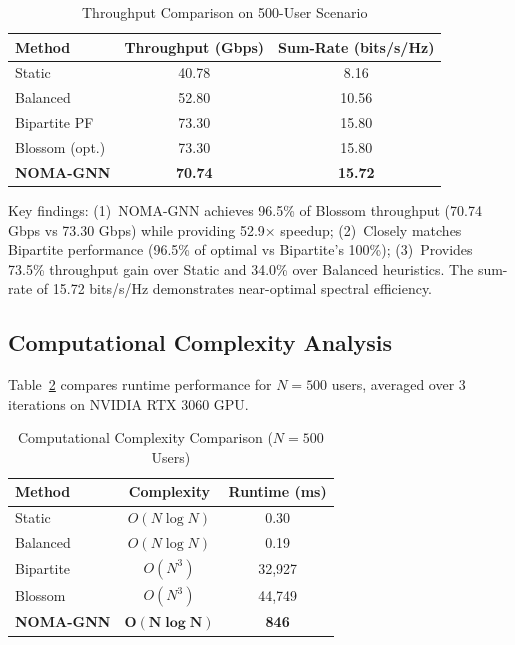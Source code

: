 \begin{table}[!t]
\centering
\caption{Throughput Comparison on 500-User Scenario}
\label{tab:throughput_stats}
\begin{tabular}{l c c}
\toprule
\textbf{Method} & \textbf{Throughput (Gbps)} & \textbf{Sum-Rate (bits/s/Hz)} \\
\midrule
Static & 40.78 & 8.16 \\
Balanced & 52.80 & 10.56 \\
Bipartite PF & 73.30 & 15.80 \\
Blossom (opt.) & 73.30 & 15.80 \\
\textbf{NOMA-GNN} & \textbf{70.74} & \textbf{15.72} \\
\bottomrule
\end{tabular}
\end{table}

Key findings: (1)~NOMA-GNN achieves 96.5\% of Blossom throughput (70.74 Gbps vs 73.30 Gbps) while providing 52.9× speedup; (2)~Closely matches Bipartite performance (96.5\% of optimal vs Bipartite's 100\%); (3)~Provides 73.5\% throughput gain over Static and 34.0\% over Balanced heuristics. The sum-rate of 15.72 bits/s/Hz demonstrates near-optimal spectral efficiency.

\subsection{Computational Complexity Analysis}

Table~\ref{tab:complexity} compares runtime performance for $N=500$ users, averaged over 3 iterations on NVIDIA RTX 3060 GPU.

\begin{table}[!t]
\centering
\caption{Computational Complexity Comparison ($N=500$ Users)}
\label{tab:complexity}
\begin{tabular}{l c c}
\toprule
\textbf{Method} & \textbf{Complexity} & \textbf{Runtime (ms)} \\
\midrule
Static & $O(N \log N)$ & 0.30 \\
Balanced & $O(N \log N)$ & 0.19 \\
Bipartite & $O(N^3)$ & 32,927 \\
Blossom & $O(N^3)$ & 44,749 \\
\textbf{NOMA-GNN} & $\boldsymbol{O(N \log N)}$ & \textbf{846} \\
\bottomrule
\end{tabular}
\end{table}

